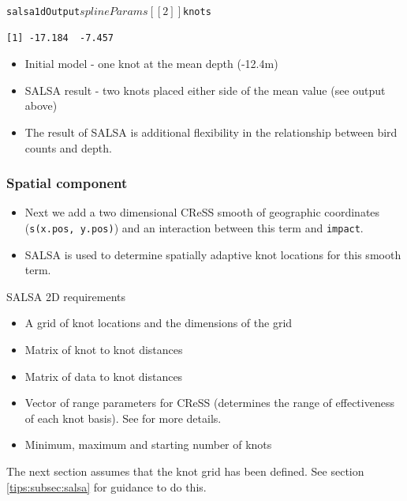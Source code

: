 \begin{frame}[fragile]
\begin{knitrout}\footnotesize
{}\color{fgcolor}\begin{kframe}
\begin{alltt}
salsa1dOutput$splineParams[[2]]$knots
\end{alltt}
\begin{verbatim}
[1] -17.184  -7.457
\end{verbatim}
\end{kframe}
\end{knitrout}

\begin{itemize}
\item Initial model - one knot at the mean depth (-12.4m) 
\item SALSA result - two knots placed either side of the mean value (see output above)
\item The result of SALSA is additional flexibility in the relationship between bird counts and depth.
\end{itemize}
\end{frame}

\begin{frame}[fragile]
\frametitle{Spatial component}
\begin{itemize}
\item Next we add a two dimensional CReSS smooth of geographic coordinates ({\tt s(x.pos, y.pos)}) and an interaction between this term and {\tt impact}.
\item SALSA is used to determine spatially adaptive knot locations for this smooth term.
\end{itemize}
\end{frame}

\begin{frame}
\begin{block}{SALSA 2D requirements}
\begin{itemize}
\item A grid of knot locations and the dimensions of the grid
\item Matrix of knot to knot distances 
\item Matrix of data to knot distances
\item Vector of range parameters for CReSS (determines the range of effectiveness of each knot basis).  See \citep{ScottH2013} for more details.
\item Minimum, maximum and starting number of knots
\end{itemize}
\end{block}
The next section assumes that the knot grid has been defined. See section \ref{tips:subsec:salsa} for guidance to do this.
\end{frame}

